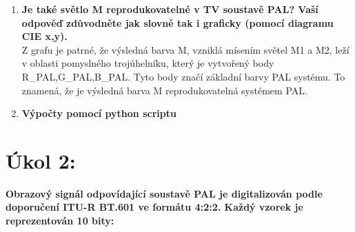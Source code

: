 \documentclass[10pt, a4paper]{article}%
\begin{document}
\begin{enumerate}
			\item \textbf{Je také světlo M reprodukovatelné v TV soustavě PAL? Vaší odpověď zdůvodněte jak slovně tak i graficky (pomocí diagramu CIE x,y).}\\
			Z grafu je patrné, že výsledná barva M, vzniklá mísením světel M1 a M2, leží v oblasti pomyslného trojúhelníku, který je vytvořený body R\_PAL,G\_PAL,B\_PAL. Tyto body
			značí základní barvy PAL systému. To znamená, že je výsledná barva M reprodukovatelná systémem PAL.			
			\item \textbf{Výpočty pomocí python scriptu}\\
			
		\end{enumerate}
		


		\section{\Large Úkol 2:}
		\noindent \textbf{Obrazový signál odpovídající soustavě PAL je digitalizován podle doporučení ITU-R BT.601 ve formátu 4:2:2. Každý vzorek je
		reprezentován 10 bity:}\\
		
\end{document}
